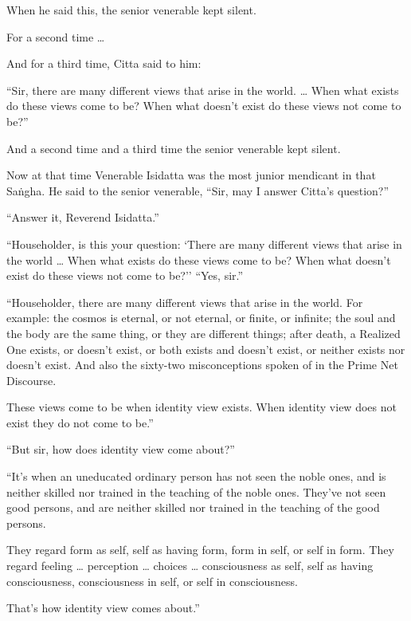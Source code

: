 \documentclass[12pt,openany]{book}%
\begin{document}
When he said this, the senior venerable kept silent. 

For a second time … 

And for a third time, Citta said to him: 

“Sir, there are many different views that arise in the world. … When what exists do these views come to be? When what doesn’t exist do these views not come to be?” 

And a second time and a third time the senior venerable kept silent. 

Now at that time Venerable Isidatta was the most junior mendicant in that \textsanskrit{Saṅgha}. He said to the senior venerable, “Sir, may I answer Citta’s question?” 

“Answer it, Reverend Isidatta.” 

“Householder, is this your question: ‘There are many different views that arise in the world … When what exists do these views come to be? When what doesn’t exist do these views not come to be?’’ “Yes, sir.” 

“Householder, there are many different views that arise in the world. For example: the cosmos is eternal, or not eternal, or finite, or infinite; the soul and the body are the same thing, or they are different things; after death, a Realized One exists, or doesn’t exist, or both exists and doesn’t exist, or neither exists nor doesn’t exist. And also the sixty-two misconceptions spoken of in the Prime Net Discourse. 

These views come to be when identity view exists. When identity view does not exist they do not come to be.” 

“But sir, how does identity view come about?” 

“It’s when an uneducated ordinary person has not seen the noble ones, and is neither skilled nor trained in the teaching of the noble ones. They’ve not seen good persons, and are neither skilled nor trained in the teaching of the good persons. 

They regard form as self, self as having form, form in self, or self in form. They regard feeling … perception … choices … consciousness as self, self as having consciousness, consciousness in self, or self in consciousness. 

That’s how identity view comes about.” 
\end{document}
